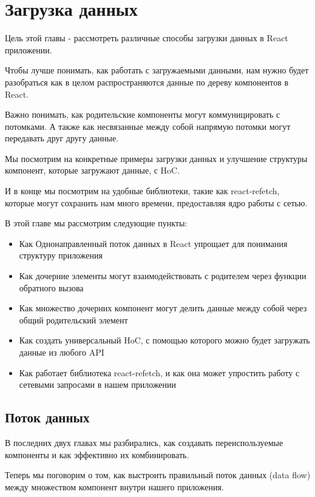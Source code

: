 \chapter{Загрузка данных}

Цель этой главы - рассмотреть различные способы загрузки данных в React приложении.

Чтобы лучше понимать, как работать с загружаемыми данными, нам нужно будет разобраться как в целом распространяются данные по дереву компонентов в React.

Важно понимать, как родительские компоненты могут коммуницировать с потомками. А также как несвязанные между собой напрямую потомки могут передавать друг другу данные.

Мы посмотрим на конкретные примеры загрузки данных и улучшение структуры компонент, которые загружают данные, с HoC.

И в конце мы посмотрим на удобные библиотеки, такие как  react-refetch, которые могут сохранить нам много времени, предоставляя ядро работы с сетью.

В этой главе мы рассмотрим следующие пункты:

\begin{itemize}
  \item Как Однонаправленный поток данных в React упрощает для понимания структуру приложения
  \item Как дочерние элементы могут взаимодействовать с родителем через функции обратного вызова
  \item Как множество дочерних компонент могут делить данные между собой через общий родительский элемент
  \item Как создать универсальный HoC, с помощью которого можно будет загружать данные из любого API
  \item Как работает библиотека react-refetch, и как она может упростить работу с сетевыми запросами в нашем приложении
\end{itemize}


\section{Поток данных}

В последних двух главах мы разбирались, как создавать переиспользуемые компоненты и как эффективно их комбинировать.

Теперь мы поговорим о том, как выстроить правильный поток данных (data flow) между множеством компонент внутри нашего приложения.

